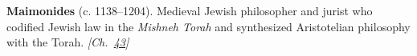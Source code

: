 \textbf{Maimonides} (c. 1138–1204). Medieval Jewish philosopher and jurist who codified Jewish law in the \emph{Mishneh Torah} and synthesized Aristotelian philosophy with the Torah. \emph{[Ch.~\hyperref[ch:nearflatuniverse]{43}]}

